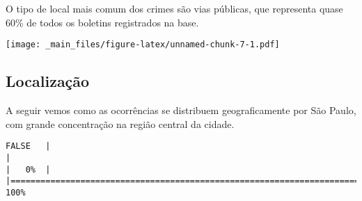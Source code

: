 \documentclass[
  12pt,
]{report}
\begin{document}
O tipo de local mais comum dos crimes são vias públicas, que representa quase 60\% de todos os boletins registrados na base.

\texttt{[image: \_main\_files/figure-latex/unnamed-chunk-7-1.pdf]}

\hypertarget{localizauxe7uxe3o}{%
\subsection{Localização}\label{localizauxe7uxe3o}}

A seguir vemos como as ocorrências se distribuem geograficamente por São Paulo, com grande concentração na região central da cidade.

\begin{verbatim}
FALSE   |                                                                              |                                                                      |   0%  |                                                                              |======================================================================| 100%

\end{verbatim}
\end{document}
